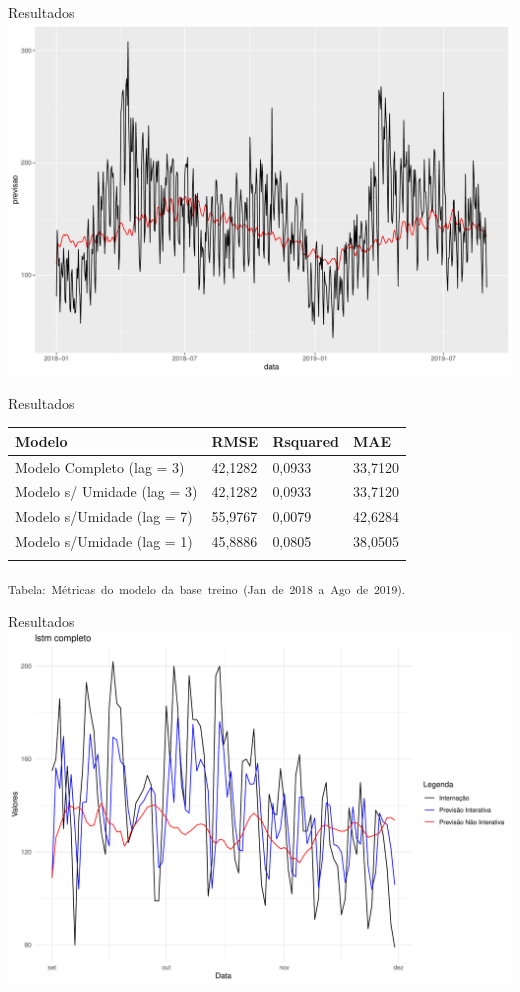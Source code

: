 \documentclass[
  ignorenonframetext,
]{beamer}
\begin{document}
\begin{frame}{Resultados}
\label{resultados-2}
\includegraphics[width=1\textwidth,height=\textheight]{apresentacao_files/figure-beamer/unnamed-chunk-12-1.pdf}
\end{frame}

\begin{frame}{Resultados}
\label{resultados-3}
\begin{longtable}[]{@{}llll@{}}
\toprule\noalign{}
Modelo & RMSE & Rsquared & MAE \\
\midrule\noalign{}
\endhead
Modelo Completo (lag = 3) & 42,1282 & 0,0933 & 33,7120 \\
Modelo s/ Umidade (lag = 3) & 42,1282 & 0,0933 & 33,7120 \\
Modelo s/Umidade (lag = 7) & 55,9767 & 0,0079 & 42,6284 \\
Modelo s/Umidade (lag = 1) & 45,8886 & 0,0805 & 38,0505 \\
\bottomrule\noalign{}
\end{longtable}

\textsubscript{Tabela:~Métricas~do~modelo~da~base~treino~(Jan~de~2018~a~Ago~de~2019).}
\end{frame}

\begin{frame}{Resultados}
\label{resultados-4}
\includegraphics[width=1\textwidth,height=\textheight]{apresentacao_files/figure-beamer/unnamed-chunk-13-1.pdf}
\end{frame}
\end{document}
